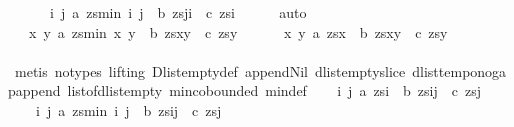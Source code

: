 \begin{isabellebody}
\ \ \ \ \ \ {\isacharparenleft}{\isasymexists}i\ j{\isachardot}\ a\ {\isacharparenleft}zs{\isasymdagger}{\isachardot}{\isachardot}min\ i\ j{\isacharparenright}\ {\isasymand}\ b\ {\isacharparenleft}zs{\isasymdagger}j{\isachardot}{\isachardot}i{\isacharparenright}\ {\isasymand}\ c\ {\isacharparenleft}zs{\isasymdagger}i{\isachardot}{\isachardot}{\isacharparenright}{\isacharparenright}{\isachardoublequoteclose}\isanewline
\ \ \ \ \isamarkupfalse%
\ auto\isanewline
\ \ \isamarkupfalse%
\ {}{\isacharcolon}\ {\isachardoublequoteopen}{\isacharparenleft}{\isasymexists}\ x\ y{\isachardot}\ a\ {\isacharparenleft}zs{\isasymdagger}{\isachardot}{\isachardot}min\ x\ y{\isacharparenright}\ {\isasymand}\ b\ {\isacharparenleft}zs{\isasymdagger}x{\isachardot}{\isachardot}y{\isacharparenright}\ {\isasymand}\ c\ {\isacharparenleft}zs{\isasymdagger}y{\isachardot}{\isachardot}{\isacharparenright}{\isacharparenright}\ {\isasymlongleftrightarrow}\isanewline
\ \ \ \ {\isacharparenleft}{\isasymexists}\ x\ y{\isachardot}\ a\ {\isacharparenleft}zs{\isasymdagger}{\isachardot}{\isachardot}x{\isacharparenright}\ {\isasymand}\ b\ {\isacharparenleft}zs{\isasymdagger}x{\isachardot}{\isachardot}y{\isacharparenright}\ {\isasymand}\ c\ {\isacharparenleft}zs{\isasymdagger}y{\isachardot}{\isachardot}{\isacharparenright}{\isacharparenright}{\isachardoublequoteclose}\isanewline
\ \ \ \ \isamarkupfalse%
\ {}\isanewline
\ \ \ \ \isamarkupfalse%
\ {\isacharparenleft}metis\ {\isacharparenleft}no{\isacharunderscore}types{\isacharcomma}\ lifting{\isacharparenright}\ Dlist{\isachardot}empty{\isacharunderscore}def\ append{\isacharunderscore}Nil{}\ dlist{\isacharunderscore}empty{\isacharunderscore}slice\ dlist{\isacharunderscore}tempo{\isacharunderscore}{}{\isacharunderscore}no{\isacharunderscore}gap{\isacharunderscore}append\ list{\isacharunderscore}of{\isacharunderscore}dlist{\isacharunderscore}empty\ min{\isachardot}cobounded{}\ min{\isacharunderscore}def{\isacharparenright}\isanewline
\ \ \isamarkupfalse%
\ {\isachardoublequoteopen}{\isacharparenleft}{\isasymexists}i\ j{\isachardot}\ a\ {\isacharparenleft}zs{\isasymdagger}{\isachardot}{\isachardot}i{\isacharparenright}\ {\isasymand}\ b\ {\isacharparenleft}zs{\isasymdagger}i{\isachardot}{\isachardot}j{\isacharparenright}\ {\isasymand}\ c\ {\isacharparenleft}zs{\isasymdagger}j{\isachardot}{\isachardot}{\isacharparenright}{\isacharparenright}\ {\isasymlongleftrightarrow}\ \isanewline
\ \ \ \ {\isacharparenleft}{\isasymexists}i\ j{\isachardot}\ a\ {\isacharparenleft}zs{\isasymdagger}{\isachardot}{\isachardot}min\ i\ j{\isacharparenright}\ {\isasymand}\ b\ {\isacharparenleft}zs{\isasymdagger}i{\isachardot}{\isachardot}j{\isacharparenright}\ {\isasymand}\ c\ {\isacharparenleft}zs{\isasymdagger}j{\isachardot}{\isachardot}{\isacharparenright}{\isacharparenright}{\isachardoublequoteclose}\isanewline

\end{isabellebody}
